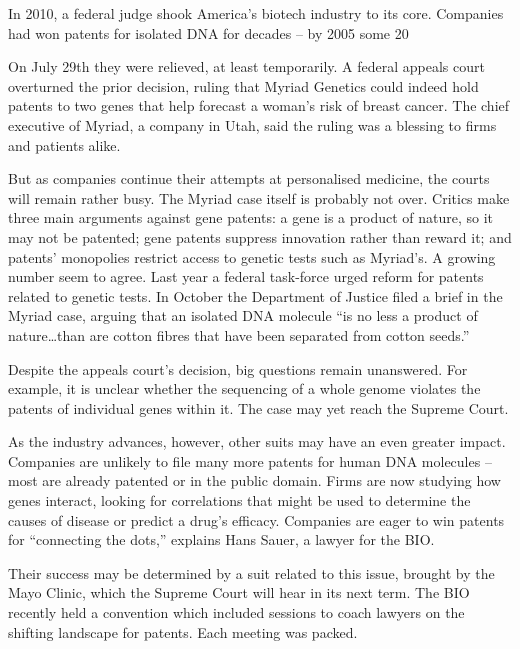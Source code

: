 In 2010, a federal judge shook America's biotech industry to its core. Companies had won patents for isolated DNA for decades – by 2005 some 20%


On July 29th they were relieved, at least temporarily. A federal appeals court overturned the prior decision, ruling that Myriad Genetics could indeed hold patents to two genes that help forecast a woman's risk of breast cancer. The chief executive of Myriad, a company in Utah, said the ruling was a blessing to firms and patients alike.


But as companies continue their attempts at personalised medicine, the courts will remain rather busy. The Myriad case itself is probably not over. Critics make three main arguments against gene patents: a gene is a product of nature, so it may not be patented; gene patents suppress innovation rather than reward it; and patents' monopolies restrict access to genetic tests such as Myriad's. A growing number seem to agree. Last year a federal task-force urged reform for patents related to genetic tests. In October the Department of Justice filed a brief in the Myriad case, arguing that an isolated DNA molecule ``is no less a product of nature…than are cotton fibres that have been separated from cotton seeds.''


Despite the appeals court's decision, big questions remain unanswered. For example, it is unclear whether the sequencing of a whole genome violates the patents of individual genes within it. The case may yet reach the Supreme Court.


As the industry advances, however, other suits may have an even greater impact. Companies are unlikely to file many more patents for human DNA molecules – most are already patented or in the public domain. Firms are now studying how genes interact, looking for correlations that might be used to determine the causes of disease or predict a drug's efficacy. Companies are eager to win patents for ``connecting the dots,'' explains Hans Sauer, a lawyer for the BIO.


Their success may be determined by a suit related to this issue, brought by the Mayo Clinic, which the Supreme Court will hear in its next term. The BIO recently held a convention which included sessions to coach lawyers on the shifting landscape for patents. Each meeting was packed.